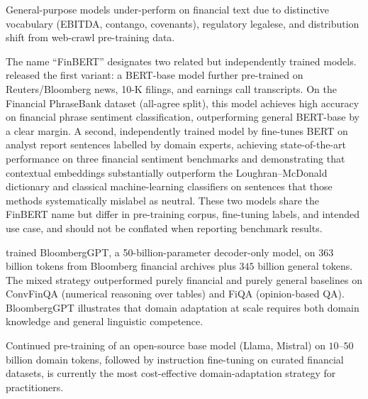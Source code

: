 \begin{deepdive}
General-purpose models under-perform on financial text due to distinctive vocabulary
(EBITDA, contango, covenants), regulatory legalese, and distribution shift from
web-crawl pre-training data.

\begin{example}
\label{ex:finbert}
The name ``FinBERT'' designates two related but independently trained models.
\citet{araci2019finbert} %
released the first variant: a BERT-base model further pre-trained on Reuters/Bloomberg
news, 10-K filings, and earnings call transcripts.
On the Financial PhraseBank dataset \cite{malo2014phrasebank} %
(all-agree split), this model achieves high accuracy on financial phrase
sentiment classification, outperforming general BERT-base by a clear margin.  A second, independently trained model by \citet{huang2023finbert}
fine-tunes BERT on analyst report sentences labelled by domain experts, achieving
state-of-the-art performance on three financial sentiment benchmarks and demonstrating
that contextual embeddings substantially outperform the Loughran--McDonald dictionary
and classical machine-learning classifiers on sentences that those methods
systematically mislabel as neutral.  These two models share the FinBERT name but
differ in pre-training corpus, fine-tuning labels, and intended use case, and should
not be conflated when reporting benchmark results.
\end{example}

\begin{example}[BloombergGPT]
\label{ex:bloomberggpt}
\citet{wu2023bloomberggpt} %
trained BloombergGPT, a 50-billion-parameter decoder-only model, on $363$ billion
tokens from Bloomberg financial archives plus $345$ billion general tokens.
The mixed strategy outperformed purely financial and purely general baselines on
ConvFinQA (numerical reasoning over tables) and FiQA (opinion-based QA).
BloombergGPT illustrates that domain adaptation at scale requires both domain
knowledge and general linguistic competence.
\end{example}

\begin{remark}
Continued pre-training of an open-source base model (Llama, Mistral) on
$10$--$50$ billion domain tokens, followed by instruction fine-tuning on curated
financial datasets, is currently the most cost-effective domain-adaptation strategy
for practitioners.
\end{remark}

\end{deepdive}


